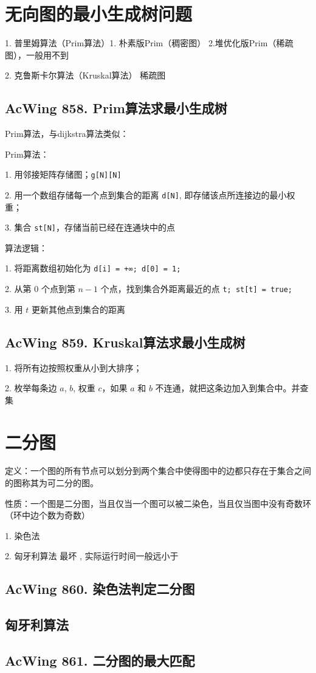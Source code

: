 \section{无向图的最小生成树问题}

1. 普里姆算法（Prim算法）1. 朴素版Prim（稠密图） 2.堆优化版Prim（稀疏图），一般用不到

2. 克鲁斯卡尔算法（Kruskal算法） 稀疏图

\subsection{AcWing 858. Prim算法求最小生成树}
Prim算法，与dijkstra算法类似：

Prim算法：

1. 用邻接矩阵存储图；\lstinline{g[N][N]}

2. 用一个数组存储每一个点到集合的距离 \lstinline{d[N]}, 即存储该点所连接边的最小权重；

3. 集合 \lstinline{st[N]}，存储当前已经在连通块中的点

算法逻辑：

1. 将距离数组初始化为 \lstinline{d[i] = +∞; d[0] = 1;}

2. 从第 $0$ 个点到第 $n - 1$ 个点，找到集合外距离最近的点 \lstinline{t; st[t] = true;}

3. 用 $t$ 更新其他点到集合的距离

\subsection{AcWing 859. Kruskal算法求最小生成树}

1. 将所有边按照权重从小到大排序；

2. 枚举每条边 $a$, $b$, 权重 $c$，如果 $a$ 和 $b$ 不连通，就把这条边加入到集合中。并查集


\section{二分图}

定义：一个图的所有节点可以划分到两个集合中使得图中的边都只存在于集合之间的图称其为可二分的图。

性质：一个图是二分图，当且仅当一个图可以被二染色，当且仅当图中没有奇数环（环中边个数为奇数）

1. 染色法 

2. 匈牙利算法 最坏 , 实际运行时间一般远小于 

\subsection{AcWing 860. 染色法判定二分图}

\subsection{匈牙利算法}

\subsection{AcWing 861. 二分图的最大匹配}

